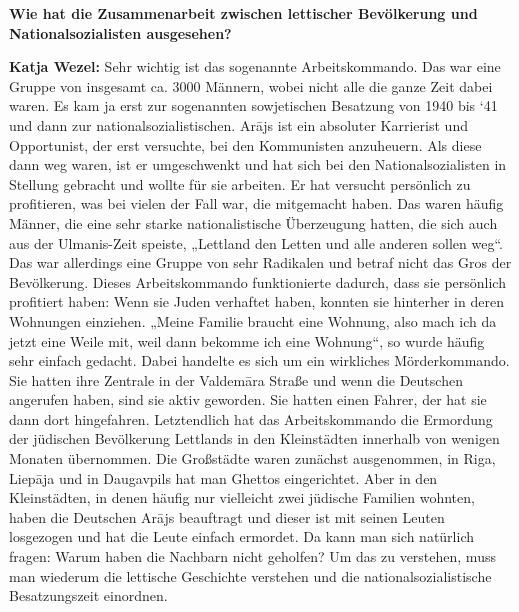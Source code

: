 \textbf{Wie hat die Zusammenarbeit zwischen lettischer Bevölkerung und Nationalsozialisten ausgesehen?} 

\textbf{Katja Wezel:} Sehr wichtig ist das sogenannte Arbeitskommando. Das war eine Gruppe von insgesamt ca. 3000 Männern, wobei nicht alle die ganze Zeit dabei waren. Es kam ja erst zur sogenannten sowjetischen Besatzung von 1940 bis ‘41 und dann zur nationalsozialistischen. Arājs ist ein absoluter Karrierist und Opportunist, der erst versuchte, bei den Kommunisten anzuheuern. Als diese dann weg waren, ist er umgeschwenkt und hat sich bei den Nationalsozialisten in Stellung gebracht und wollte für sie arbeiten. Er hat versucht persönlich zu profitieren, was bei vielen der Fall war, die mitgemacht haben. Das waren häufig Männer, die eine sehr starke nationalistische Überzeugung hatten, die sich auch aus der Ulmanis-Zeit speiste, „Lettland den Letten und alle anderen sollen weg“. Das war allerdings eine Gruppe von sehr Radikalen und betraf nicht das Gros der Bevölkerung. Dieses Arbeitskommando funktionierte dadurch, dass sie persönlich profitiert haben: Wenn sie Juden verhaftet haben, konnten sie hinterher in deren Wohnungen einziehen. „Meine Familie braucht eine Wohnung, also mach ich da jetzt eine Weile mit, weil dann bekomme ich eine Wohnung“, so wurde häufig sehr einfach gedacht. Dabei handelte es sich um ein wirkliches Mörderkommando. Sie hatten ihre Zentrale in der Valdemāra Straße und wenn die Deutschen angerufen haben, sind sie aktiv geworden. Sie hatten einen Fahrer, der hat sie dann dort hingefahren. Letztendlich hat das Arbeitskommando die Ermordung der jüdischen Bevölkerung Lettlands in den Kleinstädten innerhalb von wenigen Monaten übernommen. Die Großstädte waren zunächst ausgenommen, in Riga, Liepāja und in Daugavpils hat man Ghettos eingerichtet. Aber in den Kleinstädten, in denen häufig nur vielleicht zwei jüdische Familien wohnten, haben die Deutschen Arājs beauftragt und dieser ist mit seinen Leuten losgezogen und hat die Leute einfach ermordet. Da kann man sich natürlich fragen: Warum haben die Nachbarn nicht geholfen? Um das zu verstehen, muss man wiederum die lettische Geschichte verstehen und die nationalsozialistische Besatzungszeit einordnen.\\
